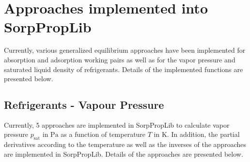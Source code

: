 \chapter{Approaches implemented into SorpPropLib}
\label{cha:approaches}
%
Currently, various generalized equilibrium approaches have been implemented for absorption and adsorption working pairs as well as for the vapor pressure and saturated liquid density of refrigerants. Details of the implemented functions are presented below.
\section{Refrigerants - Vapour Pressure}
\label{cha:approaches:refp}
%
Currently, 5 approaches are implemented in SorpPropLib to calculate vapor pressure $p_\mathrm{sat}$ in $\si{\pascal}$ as a function of temperature $T$ in $\si{\kelvin}$. In addition, the partial derivatives according to the temperature as well as the inverses of the approaches are implemented in SorpPropLib. Details of the approaches are presented below.
